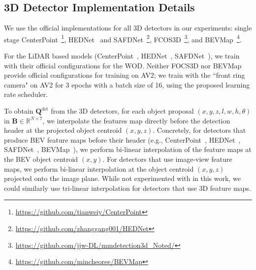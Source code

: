 \subsection{3D Detector Implementation Details}

We use the official implementations for all 3D detectors in our experiments:
single stage CenterPoint~\cite{centerpoint}\footnote{\href{https://github.com/tianweiy/CenterPoint}{https://github.com/tianweiy/CenterPoint}},
HEDNet~\cite{hednet} and SAFDNet~\cite{safdnet}\footnote{\href{https://github.com/zhanggang001/HEDNet}{https://github.com/zhanggang001/HEDNet}},
FCOS3D~\cite{wang2021fcos3d}\footnote{\href{https://github.com/jjw-DL/mmdetection3d\_Noted/tree/master/configs/fcos3d}{https://github.com/jjw-DL/mmdetection3d\_Noted/}},
and BEVMap~\cite{chang2024bevmap}\footnote{\href{https://github.com/mincheoree/BEVMap}{https://github.com/mincheoree/BEVMap}}.

For the LiDAR based models (CenterPoint~\cite{centerpoint}, HEDNet~\cite{hednet}, SAFDNet~\cite{safdnet}),
we train with their official configurations for the WOD.
Neither FOCS3D nor BEVMap provide official configurations for training on AV2;
we train with the ``front ring camera" on AV2 for 3 epochs with a batch size of 16, using the proposed learning rate scheduler.

To obtain $\mathbf{Q}^\mathrm{det}$ from the 3D detectors,
for each object proposal $(x, y, z, l, w, h, \theta)$ in $\mathbf{B} \in \mathbb{R}^{N \times 7}$,
we interpolate the features map directly before the detection header at the projected object centroid $(x, y, z)$.
Concretely, for detectors that produce BEV feature maps before their header
(e.g., CenterPoint~\cite{centerpoint}, HEDNet~\cite{hednet}, SAFDNet~\cite{safdnet}, BEVMap~\cite{chang2024bevmap}),
we perform bi-linear interpolation of the feature maps at the BEV object centroid $(x, y)$.
For detectors that use image-view feature maps, we perform bi-linear
interpolation at the object centroid $(x, y, z)$ projected onto the image plane.
While not experimented with in this work, we could similarly use tri-linear interpolation for detectors that use 3D feature maps.